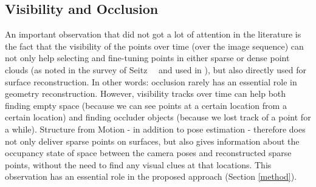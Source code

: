 \subsection{Visibility and Occlusion}
An important observation that did not got a lot of attention in the literature is the fact that the visibility of the points over time (\ie over the image sequence) can not only help selecting and fine-tuning points in either sparse or dense point clouds (as noted in the survey of Seitz~\etal~\cite{Seitz2006} and used in \cite{Merrell2007, Hernandez2007}), but also directly used for surface reconstruction. In other words: occlusion rarely has an essential role in geometry reconstruction. However, visibility tracks over time can help both finding empty space (because we can see points at a certain location from a certain location) and finding occluder objects (because we lost track of a point for a while). Structure from Motion - in addition to pose estimation - therefore does not only deliver sparse points on surfaces, but also gives information about the occupancy state of space between the camera poses and reconstructed sparse points, without the need to find any visual clues at that locations. This observation has an essential role in the proposed approach (Section \ref{method}).


